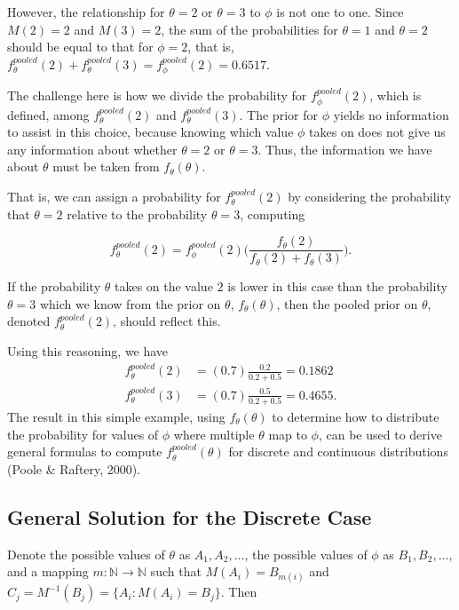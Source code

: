 \documentclass[12pt,twoside]{smiththesis}
\begin{document}
However, the relationship for \(\theta=2\) or \(\theta=3\) to \(\phi\) is not one to one. Since \(M(2)=2\) and \(M(3)=2\), the sum of the probabilities for \(\theta=1\) and \(\theta=2\) should be equal to that for \(\phi=2\), that is, \(f_\theta^{pooled}(2) + f_\theta^{pooled}(3) = f_\phi^{pooled}(2) = 0.6517\).

The challenge here is how we divide the probability for \(f_\phi^{pooled}(2)\), which is defined, among \(f_\theta^{pooled}(2)\) and \(f_\theta^{pooled}(3)\). The prior for \(\phi\) yields no information to assist in this choice, because knowing which value \(\phi\) takes on does not give us any information about whether \(\theta=2\) or \(\theta=3\). Thus, the information we have about \(\theta\) must be taken from \(f_\theta(\theta)\).

That is, we can assign a probability for \(f_\theta^{pooled}(2)\) by considering the probability that \(\theta = 2\) relative to the probability \(\theta =3\), computing

\[f_\theta^{pooled}(2) = f_\phi^{pooled}(2) \Big( \frac{f_\theta(2)}{f_\theta(2) + f_\theta(3)}\Big).\]

If the probability \(\theta\) takes on the value \(2\) is lower in this case than the probability \(\theta=3\) which we know from the prior on \(\theta\), \(f_\theta(\theta)\), then the pooled prior on \(\theta\), denoted \(f_\theta^{pooled}(2)\), should reflect this.

Using this reasoning, we have
\begin{align*} f_\theta^{pooled}(2) &= (0.7) \frac{0.2}{0.2+0.5} = 0.1862\\
f_\theta^{pooled}(3) &= (0.7) \frac{0.5}{0.2+0.5} = 0.4655.
\end{align*}
The result in this simple example, using \(f_\theta(\theta)\) to determine how to distribute the probability for values of \(\phi\) where multiple \(\theta\) map to \(\phi\), can be used to derive general formulas to compute \(f_\theta^{pooled}(\theta)\) for discrete and continuous distributions (Poole \& Raftery, 2000).

\hypertarget{general-solution-for-the-discrete-case}{%
\subsection{General Solution for the Discrete Case}\label{general-solution-for-the-discrete-case}}

Denote the possible values of \(\theta\) as \(A_1, A_2, \dots\), the possible values of \(\phi\) as \(B_1, B_2, \dots\), and a mapping \(m: \mathbb{N} \to \mathbb{N}\) such that \(M(A_i) = B_{m(i)}\)
and \(C_j = M^{-1}(B_j) = \{A_i : M(A_i) = B_j\}\). Then
\end{document}
